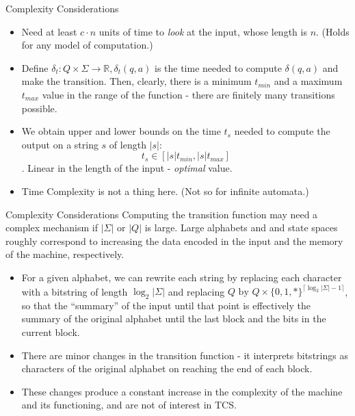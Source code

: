 \documentclass{beamer}
\begin{document}
\begin{frame}{Complexity Considerations}\pause
\begin{itemize}
    \item Need at least \(c\cdot n \) units of time to \emph{look} at the input, whose length is \(n\). (Holds for any model of computation.) \pause
    \item Define \( \delta_t : Q \times \Sigma \rightarrow \mathbb{R}, \delta_t(q, a)\) is the time needed to compute \(\delta(q, a)\) and make the transition. Then, clearly, there is a minimum $t_{min}$ and a maximum $t_{max}$ value in the range of the function - there are finitely many transitions possible. \pause
    \item We obtain upper and lower bounds on the time $t_s$ needed to compute the output on a string $s$ of length $ |s|$: \[t_s \in [|s|t_{min}, |s|t_{max}] \]. Linear in the length of the input - \emph{optimal} value. \pause
    \item \alert{Time Complexity} is not a thing here. (Not so for infinite automata.)
\end{itemize}
\end{frame}
\begin{frame}{Complexity Considerations}
Computing the transition function may need a complex mechanism if \( |\Sigma |\) or \(|Q|\) is large. Large alphabets and and state spaces roughly correspond to increasing the data encoded in the input and the memory of the machine, respectively.
\begin{itemize}
\item For a given alphabet, we can rewrite each string by replacing each character with a bitstring of length \( \log_2 |\Sigma |\) and replacing \(Q\text{ by } Q \times \{0, 1, * \}^{ \lceil \log_2 |\Sigma | - 1 \rceil}\), so that the ``summary'' of the input until that point is effectively the summary of the original alphabet until the last block and the bits in the current block.
\item There are minor changes in the transition function - it interprets bitstrings as characters of the original alphabet on reaching the end of each block.
\item These changes produce a constant increase in the complexity of the machine and its functioning, and are not of interest in TCS.
\end{itemize}
\end{frame}
\end{document}
